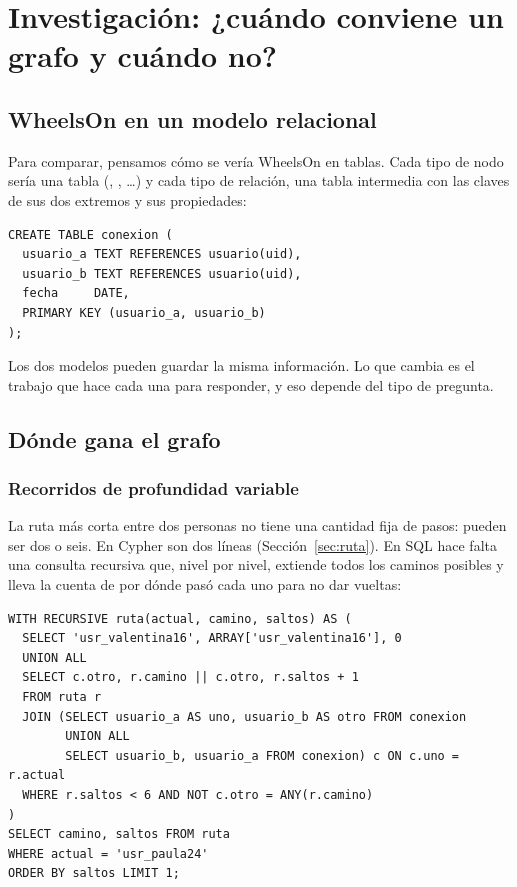 \documentclass[11pt, a4paper]{article}
\newcommand{\cod}[1]{\texttt{\detokenize{#1}}}
\newif\ifcapturafija
\begin{document}
\capturafijafalse
\section{Investigación: ¿cuándo conviene un grafo y cuándo no?}\label{sec:investigacion}

\subsection{WheelsOn en un modelo relacional}

Para comparar, pensamos cómo se vería WheelsOn en tablas. Cada tipo de nodo sería una tabla
(\cod{usuario}, \cod{empresa}, \cod{oferta}…) y cada tipo de relación, una tabla
intermedia con las claves de sus dos extremos y sus propiedades:

\begin{lstlisting}[style=sql]
CREATE TABLE conexion (
  usuario_a TEXT REFERENCES usuario(uid),
  usuario_b TEXT REFERENCES usuario(uid),
  fecha     DATE,
  PRIMARY KEY (usuario_a, usuario_b)
);
\end{lstlisting}

Los dos modelos pueden guardar la misma información. Lo que cambia es el trabajo
que hace cada una para responder, y eso depende del tipo de pregunta.

\subsection{Dónde gana el grafo}

\subsubsection{Recorridos de profundidad variable}
La ruta más corta entre dos personas no tiene una cantidad fija de pasos: pueden ser
dos o seis. En Cypher son dos líneas (Sección~\ref{sec:ruta}). En SQL hace falta una
consulta recursiva que, nivel por nivel, extiende todos los caminos posibles y lleva la
cuenta de por dónde pasó cada uno para no dar vueltas:

\begin{lstlisting}[style=sql]
WITH RECURSIVE ruta(actual, camino, saltos) AS (
  SELECT 'usr_valentina16', ARRAY['usr_valentina16'], 0
  UNION ALL
  SELECT c.otro, r.camino || c.otro, r.saltos + 1
  FROM ruta r
  JOIN (SELECT usuario_a AS uno, usuario_b AS otro FROM conexion
        UNION ALL
        SELECT usuario_b, usuario_a FROM conexion) c ON c.uno = r.actual
  WHERE r.saltos < 6 AND NOT c.otro = ANY(r.camino)
)
SELECT camino, saltos FROM ruta
WHERE actual = 'usr_paula24'
ORDER BY saltos LIMIT 1;
\end{lstlisting}
\end{document}
